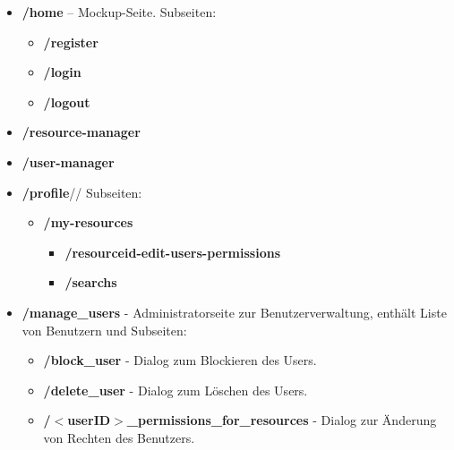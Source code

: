 \documentclass[parskip=full,11pt]{scrartcl}
\begin{document}
\begin{itemize}[itemsep=0pt]

\item \textbf{/home} – Mockup-Seite. Subseiten:
	\begin{itemize}[itemsep=0pt]
	\item \textbf{/register}
	\item \textbf{/login}
	\item \textbf{/logout}
	\end{itemize}

\item \textbf{/resource-manager}
\item \textbf{/user-manager}

\item \textbf{/profile}//
	Subseiten:
	\begin{itemize}[itemsep=0pt]
	\item \textbf{/my-resources}
		\begin{itemize}
		\item \textbf{/resourceid-edit-users-permissions}
		\item \textbf{/searchs}
		\end{itemize}

\end{itemize}



\item \textbf{/manage{\_}users} - Administratorseite zur Benutzerverwaltung, enthält Liste von Benutzern und Subseiten:
\begin{itemize}[itemsep=0pt]
\item \textbf{/block{\_}user} - Dialog zum Blockieren des Users.
\item \textbf{/delete{\_}user} - Dialog zum Löschen des Users.
\item \textbf{/$<$userID$>${\_}permissions{\_}for{\_}resources} - Dialog zur Änderung von Rechten des Benutzers.
\end{itemize}


\end{itemize}
\end{document}
